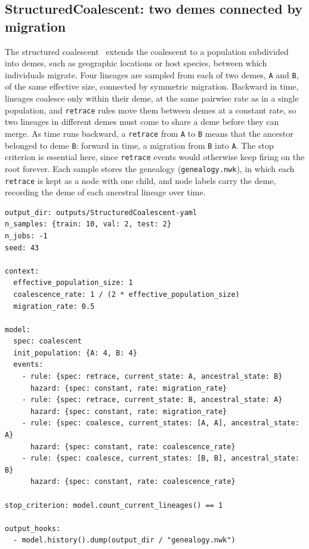 \documentclass[11pt]{article}
\begin{document}
\subsection{StructuredCoalescent: two demes connected by migration}
\label{ex:structcoal}

The structured coalescent~\citep{takahata1988coalescent, notohara1990coalescent}
extends the coalescent to a population subdivided into demes, such as geographic
locations or host species, between which individuals migrate. Four lineages are
sampled from each of two demes, \texttt{A} and \texttt{B}, of the same effective
size, connected by symmetric migration. Backward in time, lineages coalesce only
within their deme, at the same pairwise rate as in a single population, and
\texttt{retrace} rules move them between demes at a constant rate, so two
lineages in different demes must come to share a deme before they can merge. As
time runs backward, a \texttt{retrace} from \texttt{A} to \texttt{B} means that
the ancestor belonged to deme \texttt{B}: forward in time, a migration from
\texttt{B} into \texttt{A}. The stop criterion is essential here, since
\texttt{retrace} events would otherwise keep firing on the root forever. Each
sample stores the genealogy (\texttt{genealogy.nwk}), in which each
\texttt{retrace} is kept as a node with one child, and node labels carry the
deme, recording the deme of each ancestral lineage over time.

\begin{lstlisting}[style=cfg]
output_dir: outputs/StructuredCoalescent-yaml
n_samples: {train: 10, val: 2, test: 2}
n_jobs: -1
seed: 43

context:
  effective_population_size: 1
  coalescence_rate: 1 / (2 * effective_population_size)
  migration_rate: 0.5

model:
  spec: coalescent
  init_population: {A: 4, B: 4}
  events:
    - rule: {spec: retrace, current_state: A, ancestral_state: B}
      hazard: {spec: constant, rate: migration_rate}
    - rule: {spec: retrace, current_state: B, ancestral_state: A}
      hazard: {spec: constant, rate: migration_rate}
    - rule: {spec: coalesce, current_states: [A, A], ancestral_state: A}
      hazard: {spec: constant, rate: coalescence_rate}
    - rule: {spec: coalesce, current_states: [B, B], ancestral_state: B}
      hazard: {spec: constant, rate: coalescence_rate}

stop_criterion: model.count_current_lineages() == 1

output_hooks:
  - model.history().dump(output_dir / "genealogy.nwk")
\end{lstlisting}
\end{document}
